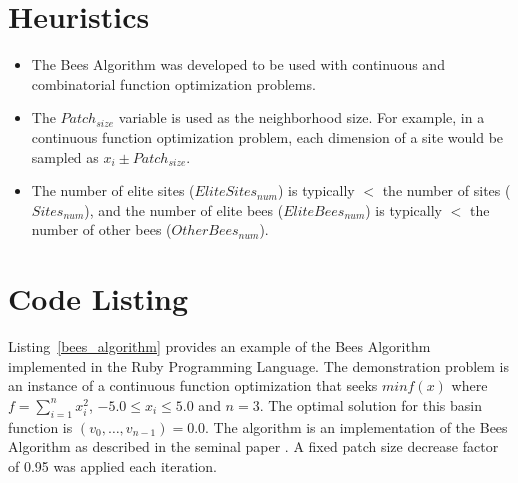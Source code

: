 \documentclass[a4paper, 11pt]{article}
\begin{document}
\section{Heuristics}
\label{sec:heuristics}
\begin{itemize}
	\item The Bees Algorithm was developed to be used with continuous and combinatorial function optimization problems.
	\item The $Patch_{size}$ variable is used as the neighborhood size. For example, in a continuous function optimization problem, each dimension of a site would be sampled as $x_i \pm Patch_{size}$.
	\item The number of elite sites ($EliteSites_{num}$) is typically $<$ the number of sites ($Sites_{num}$), and the number of elite bees ($EliteBees_{num}$) is typically $<$ the number of other bees ($OtherBees_{num}$).
\end{itemize}

\section{Code Listing}
\label{sec:code}
Listing~\ref{bees_algorithm} provides an example of the Bees Algorithm implemented in the Ruby Programming Language. 
The demonstration problem is an instance of a continuous function optimization that seeks $min f(x)$ where $f=\sum_{i=1}^n x_{i}^2$, $-5.0\leq x_i \leq 5.0$ and $n=3$. The optimal solution for this basin function is $(v_0,\ldots,v_{n-1})=0.0$.
The algorithm is an implementation of the Bees Algorithm as described in the seminal paper \cite{Pham2006}. A fixed patch size decrease factor of 0.95 was applied each iteration.
\end{document}
